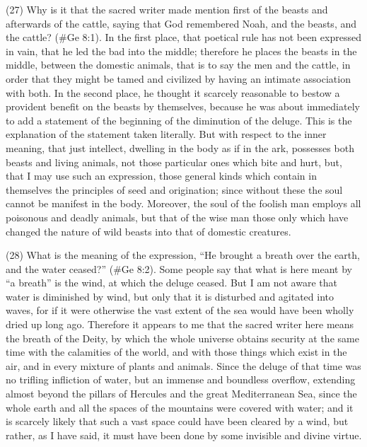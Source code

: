 (27) Why is it that the sacred writer made mention first of the beasts and afterwards of the cattle,
saying that God remembered Noah, and the beasts, and the cattle? (\#Ge 8:1). In the first
place, that poetical rule has not been expressed in vain, that he led the bad into the middle;
therefore he places the beasts in the middle, between the domestic animals, that is to say the men
and the cattle, in order that they might be tamed and civilized by having an intimate association with
both. In the second place, he thought it scarcely reasonable to bestow a provident benefit on the
beasts by themselves, because he was about immediately to add a statement of the beginning of
the diminution of the deluge. This is the explanation of the statement taken literally. But with respect
to the inner meaning, that just intellect, dwelling in the body as if in the ark, possesses both beasts
and living animals, not those particular ones which bite and hurt, but, that I may use such an
expression, those general kinds which contain in themselves the principles of seed and origination;
since without these the soul cannot be manifest in the body. Moreover, the soul of the foolish man
employs all poisonous and deadly animals, but that of the wise man those only which have changed
the nature of wild beasts into that of domestic creatures.

(28) What is the meaning of the expression, ``He brought a breath over the earth, and the water
ceased?'' (\#Ge 8:2). Some people say that what is here meant by ``a breath'' is the wind, at
which the deluge ceased. But I am not aware that water is diminished by wind, but only that it is
disturbed and agitated into waves, for if it were otherwise the vast extent of the sea would have
been wholly dried up long ago. Therefore it appears to me that the sacred writer here means the
breath of the Deity, by which the whole universe obtains security at the same time with the
calamities of the world, and with those things which exist in the air, and in every mixture of plants
and animals. Since the deluge of that time was no trifling infliction of water, but an immense and
boundless overflow, extending almost beyond the pillars of Hercules and the great Mediterranean
Sea, since the whole earth and all the spaces of the mountains were covered with water; and it is
scarcely likely that such a vast space could have been cleared by a wind, but rather, as I have
said, it must have been done by some invisible and divine virtue.

